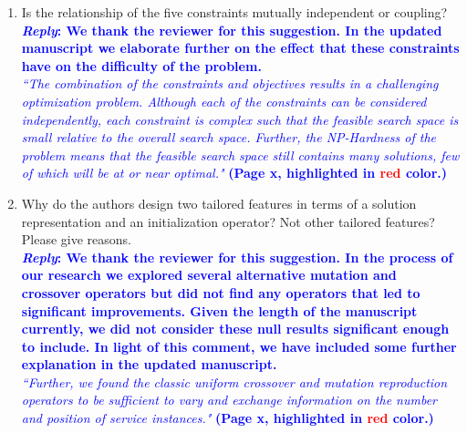 \begin{enumerate}
      \item \textsf{Is the relationship of the five constraints mutually independent or coupling?}\\
            \textcolor{blue}{\textbf{\textit{Reply}: We thank the reviewer for this suggestion. In the updated manuscript we elaborate further on the effect that these constraints have on the difficulty of the problem.}}\\
            \textcolor{blue}{\textit{``The combination of the constraints and objectives results in a challenging optimization problem. Although each of the constraints can be considered independently, each constraint is complex such that the feasible search space is small relative to the overall search space. Further, the NP-Hardness of the problem means that the feasible search space still contains many solutions, few of which will be at or near optimal."} \textbf{(Page x, highlighted in \textcolor{red}{red} color.)}}\\

      \item\textsf{Why do the authors design two tailored features in terms of a solution representation and an initialization operator? Not other tailored features? Please give reasons.}\\
            \textcolor{blue}{\textbf{\textit{Reply}: We thank the reviewer for this suggestion. In the process of our research we explored several alternative mutation and crossover operators but did not find any operators that led to significant improvements. Given the length of the manuscript currently, we did not consider these null results significant enough to include. In light of this comment, we have included some further explanation in the updated manuscript.}}\\
            \textcolor{blue}{\textit{``Further, we found the classic uniform crossover and mutation reproduction operators to be sufficient to vary and exchange information on the number and position of service instances."} \textbf{(Page x, highlighted in \textcolor{red}{red} color.)}}\\


\end{enumerate}
